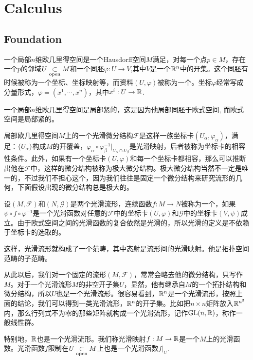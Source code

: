\chapter{Calculus}
\section{Foundation}

\para 一个局部$n$维欧几里得空间是一个Hausdorff空间$M$满足，对每一个点$p\in M$，存在一个$p$的邻域$U\underset{\mathrm{open}}{\subset} M$和一个同胚$\varphi:U\to V$,其中$V$是一个$\mathbb{R}^n$中的开集。这个同胚有时候被称为一个坐标、坐标映射等，而资料$(U,\varphi)$被称为一个。坐标$\varphi$经常写成分量形式，$\varphi=(x^1,\cdots,x^n)$，其中$x^i:U\to \mathbb{R}$.

一个局部$n$维欧几里得空间是局部紧的，这是因为他局部同胚于欧式空间, 而欧式空间是局部紧的。

\para 局部欧几里得空间$M$上的一个光滑微分结构$\mathscr{F}$是这样一族坐标卡$(U_\alpha,\varphi_\alpha)$，满足：$\{U_\alpha\}$构成$M$的开覆盖，$\varphi_\alpha\circ\varphi^{-1}_\beta|_{U_\alpha\cap U_\beta}$是光滑映射，后者被称为坐标卡的相容性条件。此外，如果有一个坐标卡$(U,\varphi)$和每一个坐标卡都相容，那么可以推断出他在$\mathscr{F}$中，这样的微分结构被称为极大微分结构。极大微分结构当然不一定是唯一的，不过我们不担心这个，因为我们往往是固定一个微分结构来研究流形的几何，下面假设出现的微分结构总是极大的。

\para 设$(M,\mathscr{F})$和$(N,\mathscr{G})$是两个光滑流形，连续函数$f:M\to N$被称为一个，如果$\psi\circ f\circ \varphi^{-1}$是一个光滑函数对任意的$\mathscr{F}$中的坐标卡$(U,\varphi)$和$\mathscr{G}$中的坐标卡$(V,\psi)$成立。由于欧式空间之间的光滑函数的复合依然是光滑的，所以光滑的定义是不依赖于坐标卡的选取的。

\para 这样，光滑流形就构成了一个范畴，其中态射是流形间的光滑映射。他是拓扑空间范畴的子范畴。

从此以后，我们对一个固定的流形$(M,\mathscr{F})$，常常会略去他的微分结构，只写作$M$。对于一个光滑流形$M$的非空开子集$U$，显然，他有继承自$M$的一个拓扑结构和微分结构，所以$U$也是一个光滑流形。很容易看到，$\mathbb{R}^n$是一个光滑流形，按照上面的结论，我们可以得到一类光滑流形，$\mathbb{R}^n$的开子集。比如把$n\times n$矩阵放入$\mathbb{R}^{n^2}$内，那么行列式不为零的那些矩阵就构成一个光滑流形，记作$\mathrm{GL}(n,\mathbb{R})$，称作一般线性群。

特别地，$\mathbb{R}$也是一个光滑流形。我们称光滑映射$f:M\to \mathbb{R}$是一个$M$上的光滑函数。光滑函数$f$限制在$U\underset{\mathrm{open}}{\subset} M$上也是一个光滑函数$f|_U$.

